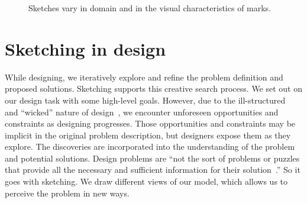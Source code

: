 \begin{figure}
\begin{center}

\hspace{0.03\linewidth}
\caption{Sketches vary in domain and in the visual characteristics of marks.}
\label{fig:types-of-sketches}

\end{center}
\end{figure}

\section{Sketching in design}
\label{sec:traditional-in-design}

While designing, we iteratively explore and refine the problem
definition and proposed solutions. Sketching supports this creative
search process. We set out on our design task with some high-level
goals. However, due to the
ill-structured~\cite{simon-ill-structured-problems} and ``wicked''
nature of design~\cite{rittel-wicked}, we encounter unforeseen
opportunities and constraints as designing progresses. Those
opportunities and constraints may be implicit in the original problem
description, but designers expose them as they explore. The
discoveries are incorporated into the understanding of the problem and
potential solutions. Design problems are ``not the sort of problems or
puzzles that provide all the necessary and sufficient information for
their solution~\cite{cross-nature-nurture}.'' So it goes with
sketching. We draw different views of our model, which allows us to
perceive the problem in new ways.

